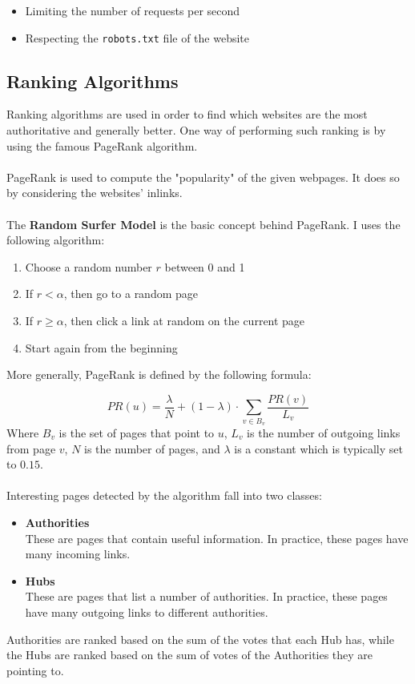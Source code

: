 \documentclass{article}
\begin{document}
\begin{itemize}
	\item Limiting the number of requests per second
	\item Respecting the \verb|robots.txt| file of the website
\end{itemize}

\subsection{Ranking Algorithms}
Ranking algorithms are used in order to find which websites are the most authoritative and generally better. One way of performing such ranking is by using the famous PageRank algorithm. \\ \\
PageRank is used to compute the "popularity" of the given webpages. It does so by considering the websites' inlinks. \\ \\
The \textbf{Random Surfer Model} is the basic concept behind PageRank. I uses the following algorithm:

\begin{enumerate}
	\item Choose a random number $r$ between 0 and 1
	\item If $r < \alpha$, then go to a random page
	\item If $r \geq \alpha$, then click a link at random on the current page
	\item Start again from the beginning
\end{enumerate}
More generally, PageRank is defined by the following formula:

\[ PR(u) = \frac{\lambda}{N} + (1 - \lambda) \cdot \sum_{v \in B_v} \frac{PR(v)}{L_v} \]
Where $B_v$ is the set of pages that point to $u$, $L_v$ is the number of outgoing links from page $v$, $N$ is the number of pages, and $\lambda$ is a constant which is typically set to $0.15$. \\ \\
Interesting pages detected by the algorithm fall into two classes:

\begin{itemize}
	\item \textbf{Authorities}
	\vspace{.2cm} \\
	These are pages that contain useful information. In practice, these pages have many incoming links.
	
	\item \textbf{Hubs}
	\vspace{.2cm} \\
	These are pages that list a number of authorities. In practice, these pages have many outgoing links to different authorities.
\end{itemize}
Authorities are ranked based on the sum of the votes that each Hub has, while the Hubs are ranked based on the sum of votes of the Authorities they are pointing to.
\end{document}
